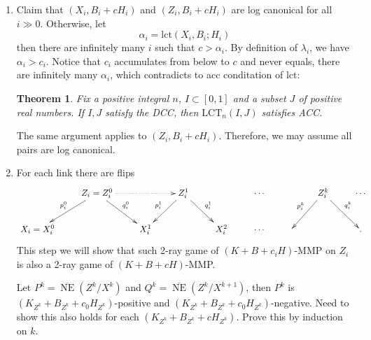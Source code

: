 \documentclass{article}
\newtheorem{thm}[defn]{Theorem}
\begin{document}
\begin{enumerate}
  \item Claim that $ (X_i,B_i+cH_i) $ and $ (Z_i,B_i+cH_i) $ are log canonical for all $ i\gg 0 $. Otherwise, let
  \[ \alpha_i=\mathrm{lct}(X_i,B_i;H_i) \]
  then there are infinitely many $ i $ such that $ c>\alpha_i $. By definition of $ \lambda_i $, we have $ \alpha_i>c_i $. Notice that $ c_i $ accumulates from below to $ c $ and never equals, there are infinitely many $ \alpha_i $, which contradicts to acc conditation of lct:
\begin{thm}
  \cite[Theorem 1.1]{birkarAscendingChainCondition2007}  Fix a positive integral $ n $, $ I\subset [0,1] $ and a subset $ J $ of positive real numbers. If $ I,J $ satisfy the DCC, then $ \mathrm{LCT}_n(I,J) $ satisfies ACC.
\end{thm}

  The same argument applies to $ (Z_i,B_i+cH_i) $. Therefore, we may assume all pairs are log canonical.
  \item For each link there are flips
  \[ \xymatrix{
    &Z_{i}=Z_i^0\ar[ld]_{p^0_i}\ar[dr]^{q^0_i}\ar@{.>}[rr]&&Z_i^1\ar[ld]_{p^1_i}\ar[rd]^{q^1_i}&&\cdots&&Z_i^k\ar[ld]_{p^k_i}\ar[dr]^{q^k_i}&\cdots\\
    X_i=X^0_i &&X^1_i&&X_i^2&\cdots&&&
.}\]
  This step we will show that such 2-ray game of $ (K+B+c_iH) $-MMP on $ Z_i $ is also a 2-ray game of $ (K+B+cH) $-MMP.

  Let $ P^k=\overline{\operatorname{NE}}(Z^k/X^k) $ and $ Q^k=\overline{\operatorname{NE}}(Z^k/X^{k+1}) $, then $ P^k $ is $ (K_{Z^k}+B_{Z^k}+c_0H_{Z^k}) $-positive and $ (K_{Z^k}+B_{Z^k}+c_0H_{Z^k}) $-negative. Need to show this also holds for each $ (K_{Z^k}+B_{Z^k}+cH_{Z^k}) $. Prove this by induction on $ k $.
  

\end{enumerate}
\end{document}
